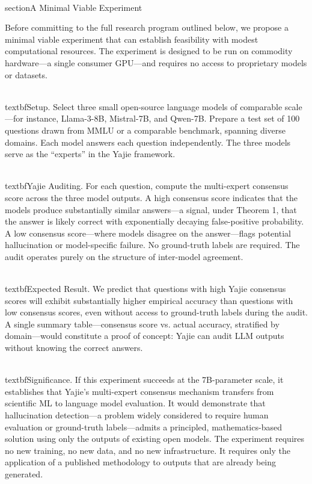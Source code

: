 \documentclass[11pt,twocolumn]{article}
\begin{document}
\\section{A Minimal Viable Experiment}

Before committing to the full research program outlined below, we propose a minimal viable experiment that can establish feasibility with modest computational resources. The experiment is designed to be run on commodity hardware—a single consumer GPU—and requires no access to proprietary models or datasets.

\\textbf{Setup.} Select three small open-source language models of comparable scale—for instance, Llama-3-8B, Mistral-7B, and Qwen-7B. Prepare a test set of 100 questions drawn from MMLU or a comparable benchmark, spanning diverse domains. Each model answers each question independently. The three models serve as the ``experts'' in the Yajie framework.

\\textbf{Yajie Auditing.} For each question, compute the multi-expert consensus score across the three model outputs. A high consensus score indicates that the models produce substantially similar answers—a signal, under Theorem 1, that the answer is likely correct with exponentially decaying false-positive probability. A low consensus score—where models disagree on the answer—flags potential hallucination or model-specific failure. No ground-truth labels are required. The audit operates purely on the structure of inter-model agreement.

\\textbf{Expected Result.} We predict that questions with high Yajie consensus scores will exhibit substantially higher empirical accuracy than questions with low consensus scores, even without access to ground-truth labels during the audit. A single summary table—consensus score vs. actual accuracy, stratified by domain—would constitute a proof of concept: Yajie can audit LLM outputs without knowing the correct answers.

\\textbf{Significance.} If this experiment succeeds at the 7B-parameter scale, it establishes that Yajie's multi-expert consensus mechanism transfers from scientific ML to language model evaluation. It would demonstrate that hallucination detection—a problem widely considered to require human evaluation or ground-truth labels—admits a principled, mathematics-based solution using only the outputs of existing open models. The experiment requires no new training, no new data, and no new infrastructure. It requires only the application of a published methodology to outputs that are already being generated.
\end{document}
